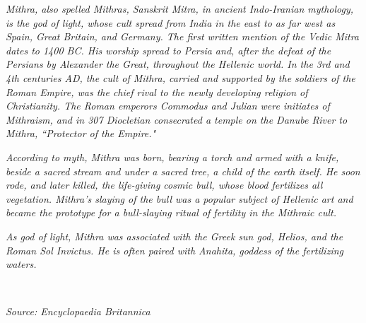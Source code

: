 \documentclass{report}
\begin{document}
{\large \noindent \textit{Mithra, also spelled Mithras, Sanskrit Mitra, in ancient Indo-Iranian mythology, is the god of light, whose cult spread from India in the east to as far west as Spain, Great Britain, and Germany. The first written mention of the Vedic Mitra dates to 1400 BC. His worship spread to Persia and, after the defeat of the Persians by Alexander the Great, throughout the Hellenic world. In the 3rd and 4th centuries AD, the cult of Mithra, carried and supported by the soldiers of the Roman Empire, was the chief rival to the newly developing religion of Christianity. The Roman emperors Commodus and Julian were initiates of Mithraism, and in 307 Diocletian consecrated a temple on the Danube River to Mithra, ``Protector of the Empire."}

\noindent \textit{According to myth, Mithra was born, bearing a torch and armed with a knife, beside a sacred stream and under a sacred tree, a child of the earth itself. He soon rode, and later killed, the life-giving cosmic bull, whose blood fertilizes all vegetation. Mithra's slaying of the bull was a popular subject of Hellenic art and became the prototype for a bull-slaying ritual of fertility in the Mithraic cult.}

\noindent \textit{As god of light, Mithra was associated with the Greek sun god, Helios, and the Roman Sol Invictus. He is often paired with Anahita, goddess of the fertilizing waters.}

\

\hspace{10cm} \textit{Source: Encyclopaedia Britannica}}

\newpage
\tableofcontents
\listoftables
\listoffigures







% 





\printindex



\end{document}

